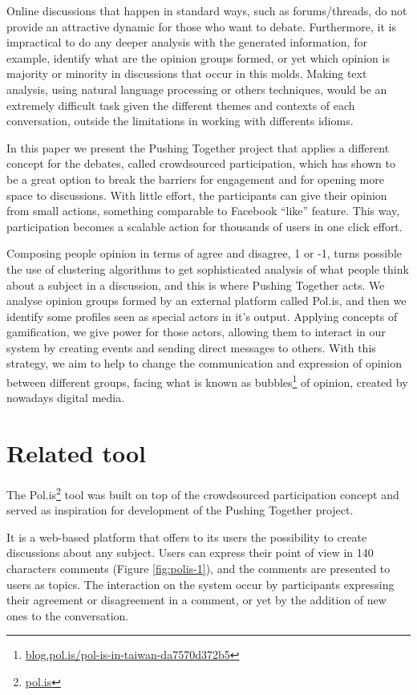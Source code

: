\documentclass{llncs}
\begin{document}
  Online discussions that happen in standard ways, such as forums/threads, do
not provide an attractive dynamic for those who want to debate. Furthermore, it
is impractical to do any deeper analysis with the generated information, for
example, identify what are the opinion groups formed, or yet which opinion is
majority or minority in discussions that occur in this molds. Making text
analysis, using natural language processing or others techniques, would be an
extremely difficult task given the different themes and contexts of each
conversation, outside the limitations in working with differents idioms.

  In this paper we present the Pushing Together project that applies a
different concept for the debates, called crowdsourced participation, which has
shown to be a great option to break the barriers for engagement and for opening
more space to discussions. With little effort, the participants can give their
opinion from small actions, something comparable to Facebook ``like'' feature.
This way, participation becomes a scalable action for thousands of users in one
click effort.

  Composing people opinion in terms of agree and disagree, 1 or -1, turns
possible the use of clustering algorithms to get sophisticated analysis of what
people think about a subject in a discussion, and this is where Pushing
Together acts. We analyse opinion groups formed by an external platform called Pol.is,
and then we identify some profiles seen as special actors in it's output.
Applying concepts of gamification, we give power for those
actors, allowing them to interact in our system by creating events and
sending direct messages to others. With this strategy, we aim to help to change
the communication and expression of opinion between different groups, facing
what is known as
bubbles\footnote{\url{blog.pol.is/pol-is-in-taiwan-da7570d372b5}} of opinion,
created by nowadays digital media.

\section{Related tool}

  The Pol.is\footnote{\url{pol.is}} tool was built on top of
the crowdsourced participation concept and served as inspiration for
development of the Pushing Together project.

  It is a web-based platform that offers to its users the possibility to
create discussions about any subject. Users can express their point of view in
140 characters comments (Figure \ref{fig:polis-1}), and the comments are presented
to users as topics. The interaction on the system occur by
participants expressing their agreement or disagreement in a comment, or yet by
the addition of new ones to the conversation.
\end{document}
